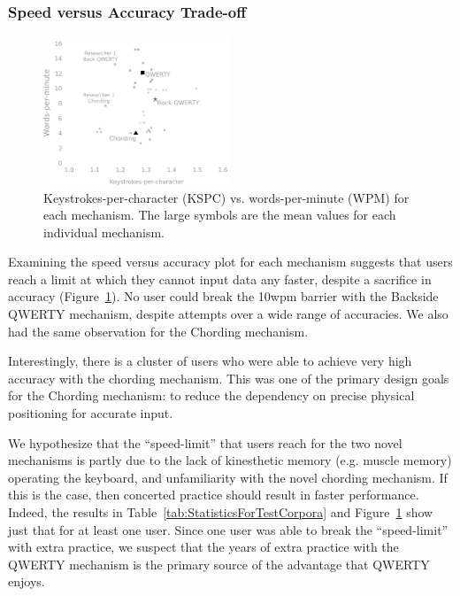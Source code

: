 \subsubsection{Speed versus Accuracy Trade-off}

\begin{figure}
    \includegraphics[width=0.5\textwidth]{Figures/kspc_vs_wpm.pdf} 
    \caption{Keystrokes-per-character (KSPC) vs. words-per-minute
      (WPM) for each mechanism.  The large symbols are the mean values
      for each individual mechanism. }
    \label{fig:kspc_vs_wpm}
\end{figure}

Examining the speed versus accuracy plot for each mechanism suggests that users reach a limit at which they cannot input data any faster, despite a sacrifice in accuracy (Figure~\ref{fig:kspc_vs_wpm}).  No user could break the 10wpm barrier with the Backside QWERTY mechanism, despite attempts over a wide range of accuracies.  We also had the same observation for the Chording mechanism.

Interestingly, there is a cluster of users who were able to achieve very high accuracy with the chording mechanism.  This was one of the primary design goals for the Chording mechanism: to reduce the dependency on precise physical positioning for accurate input.

We hypothesize that the ``speed-limit'' that users reach for the two novel mechanisms is partly due to the lack of kinesthetic memory (e.g. muscle memory) operating the keyboard, and unfamiliarity with the novel chording mechanism.  If this is the case, then concerted practice should result in faster performance.  Indeed, the results in Table~\ref{tab:StatisticsForTestCorpora} and Figure~\ref{fig:kspc_vs_wpm} show just that for at least one user. Since one user was able to break the ``speed-limit'' with extra practice, we suspect that the years of extra practice with the QWERTY mechanism is the primary source of the advantage that QWERTY enjoys.

